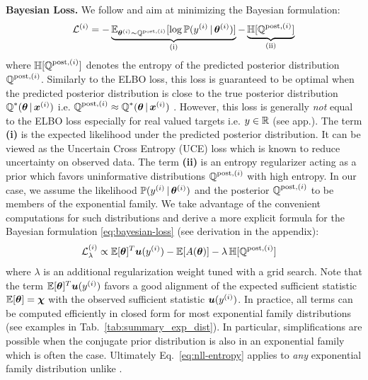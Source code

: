 \textbf{Bayesian Loss.} We follow \citet{postnet} and aim at minimizing the Bayesian formulation:
%
\begin{equation}\label{eq:bayesian-loss}
    \mathcal{L}^{(i)} = - \underbrace{\operatorname{\mathbb{E}}_{\bm{\theta}^{(i)} \sim \operatorname{\mathbb{Q}}^{\text{post},(i)}}[\log \operatorname{\mathbb{P}}(y^{(i)}\,|\, \bm{\theta} ^{(i)})]}_\text{(i)} - \underbrace{\operatorname{\mathbb{H}}[\operatorname{\mathbb{Q}}^{\text{post},(i)}]}_\text{(ii)}
\end{equation}
%
where $\operatorname{\mathbb{H}}[\operatorname{\mathbb{Q}}^{\text{post},(i)}]$ denotes the entropy of the predicted posterior distribution $\operatorname{\mathbb{Q}}^{\text{post},(i)}$. Similarly to the ELBO loss, this loss is guaranteed to be optimal when the predicted posterior distribution is close to the true posterior distribution $\operatorname{\mathbb{Q}}^*(\bm{\theta} \,|\, \bm{x}^{(i)})$ i.e. $\operatorname{\mathbb{Q}}^{\text{post},(i)} \approx \operatorname{\mathbb{Q}}^*(\bm{\theta} \,|\, \bm{x}^{(i)})$ \citep{update-belief-propagation, PAC-bayesian_estimator, opt-info-processing_bayes}. However, this loss is generally \emph{not} equal to the ELBO loss especially for real valued targets i.e. $y \in \operatorname{\mathbb{R}}$ (see app.). The term \textbf{(i)} is the expected likelihood under the predicted posterior distribution. It can be viewed as the Uncertain Cross Entropy (UCE) loss \citep{uceloss} which is known to reduce uncertainty on observed data. The term \textbf{(ii)} is an entropy regularizer acting as a prior which favors uninformative distributions $\operatorname{\mathbb{Q}}^{\text{post},(i)}$ with high entropy. In our case, we assume the likelihood $\operatorname{\mathbb{P}}(y^{(i)}\,|\,\bm{\theta}^{(i)})$ and the posterior $\operatorname{\mathbb{Q}}^{\text{post},(i)}$ to be members of the exponential family. We take advantage of the convenient computations for such distributions and derive a more explicit formula for the Bayesian formulation \eqref{eq:bayesian-loss} (see derivation in the appendix):
%
\begin{equation}\label{eq:nll-entropy}
    \begin{aligned}
    \mathcal{L}_\lambda^{(i)} &\propto \operatorname{\mathbb{E}}[\bm{\theta}]^T \bm{u}(y^{(i)}) - \operatorname{\mathbb{E}}[A(\bm{\bm{\theta}})] - \lambda\operatorname{\mathbb{H}}[\operatorname{\mathbb{Q}}^{\text{post},(i)}]
    \end{aligned}
\end{equation}
%
where $\lambda$ is an additional regularization weight tuned with a grid search. Note that the term $\operatorname{\mathbb{E}}[\bm{\theta}]^T \bm{u}(y^{(i)}) $ favors a good alignment of the expected sufficient statistic $\operatorname{\mathbb{E}}[\bm{\theta}] = \bm{\chi}$ with the observed sufficient statistic $\bm{u}(y^{(i)})$. In practice, all terms can be computed efficiently in closed form for most exponential family distributions (see examples in Tab.~\ref{tab:summary_exp_dist}). In particular, simplifications are possible when the conjugate prior distribution is also in an exponential family which is often the case. Ultimately Eq.~\eqref{eq:nll-entropy} applies to \emph{any} exponential family distribution unlike \citet{postnet}.


